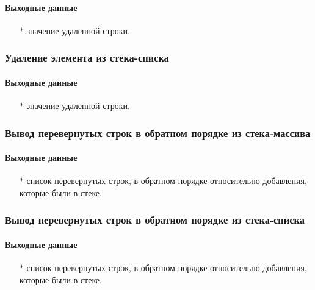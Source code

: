 \documentclass[a4paper,12pt]{extarticle}
\begin{document}
\paragraph{Выходные данные}
\begin{itemize}
    \item[$*$] значение удаленной строки.
\end{itemize}


\subsubsection{Удаление элемента из стека-списка}

\paragraph{Выходные данные}
\begin{itemize}
    \item[$*$] значение удаленной строки.
\end{itemize}


\subsubsection{Вывод перевернутых строк в обратном порядке из стека-массива}

\paragraph{Выходные данные}
\begin{itemize}
    \item[$*$] список перевернутых строк, в обратном порядке относительно добавления, которые были в стеке.
\end{itemize}


\subsubsection{Вывод перевернутых строк в обратном порядке из стека-списка}

\paragraph{Выходные данные}
\begin{itemize}
    \item[$*$] список перевернутых строк, в обратном порядке относительно добавления, которые были в стеке.
\end{itemize}
\end{document}
